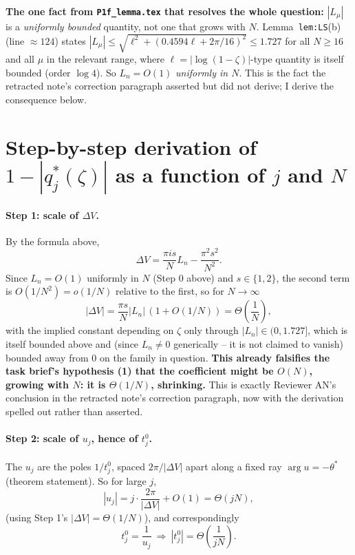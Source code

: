 \documentclass[11pt]{article}
\theoremstyle{remark}
\begin{document}
\textbf{The one fact from \texttt{P1f\_lemma.tex} that resolves the whole question:} $|L_\mu|$ is a
\emph{uniformly bounded} quantity, not one that grows with $N$. Lemma~\texttt{lem:LS}(b) (line
$\approx124$) states $|L_\mu|\le\sqrt{\ell^2+(0.4594\ell+2\pi/16)^2}\le1.727$ for all $N\ge16$ and
all $\mu$ in the relevant range, where $\ell=|\log(1-\zeta)|$-type quantity is itself bounded
(order $\log 4$). So $L_n=O(1)$ \emph{uniformly in $N$}. This is the fact the retracted note's
correction paragraph asserted but did not derive; I derive the consequence below.

\section{Step-by-step derivation of $1-|q^*_j(\zeta)|$ as a function of $j$ and $N$}

\paragraph{Step 1: scale of $\Delta V$.} By the formula above,
\[\Delta V=\frac{\pi i s}{N}L_n-\frac{\pi^2 s^2}{N^2}.\]
Since $L_n=O(1)$ uniformly in $N$ (Step 0 above) and $s\in\{1,2\}$, the second term is
$O(1/N^2)=o(1/N)$ relative to the first, so for $N\to\infty$
\[|\Delta V|=\frac{\pi s}{N}|L_n|\,(1+O(1/N))=\Theta\!\left(\frac1N\right),\]
with the implied constant depending on $\zeta$ only through $|L_n|\in(0,1.727]$, which is itself
bounded above and (since $L_n\ne0$ generically -- it is not claimed to vanish) bounded away from
$0$ on the family in question. \textbf{This already falsifies the task brief's hypothesis (1) that
the coefficient might be $O(N)$, growing with $N$: it is $\Theta(1/N)$, shrinking.} This is exactly
Reviewer AN's conclusion in the retracted note's correction paragraph, now with the derivation
spelled out rather than asserted.

\paragraph{Step 2: scale of $u_j$, hence of $t^0_j$.} The $u_j$ are the poles $1/t^0_j$, spaced
$2\pi/|\Delta V|$ apart along a fixed ray $\arg u=-\theta^*$ (theorem statement). So for large $j$,
\[|u_j| = j\cdot\frac{2\pi}{|\Delta V|}+O(1) = \Theta(jN),\]
(using Step 1's $|\Delta V|=\Theta(1/N)$), and correspondingly
\[t^0_j=\frac1{u_j}\ \Longrightarrow\ |t^0_j|=\Theta\!\left(\frac1{jN}\right).\]
\end{document}
